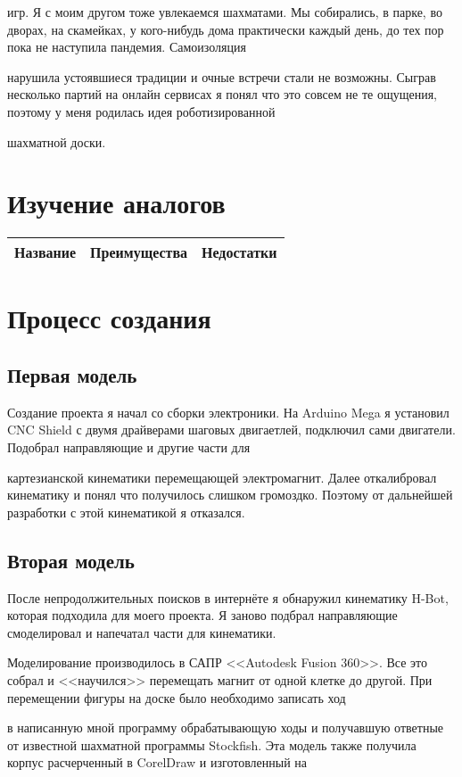 \documentclass[a4paper]{article}
\begin{document}
игр. Я с моим другом тоже увлекаемся шахматами. Мы собирались, в парке, во дворах, на скамейках, у кого-нибудь дома практически каждый день, до тех пор пока не наступила пандемия. Самоизоляция 

нарушила устоявшиеся традиции и очные встречи стали не возможны. Сыграв несколько партий на онлайн сервисах я понял что это совсем не те ощущения, поэтому у меня родилась идея роботизированной 

шахматной доски.
  
  \section {Изучение аналогов}
  \begin{tabular}{|l|l|l|} \hline
    Название & Преимущества & Недостатки \\ \hline
  \end{tabular}

  \section{Процесс создания}
  \subsection{Первая модель}
  Создание проекта я начал со сборки электроники. На Arduino Mega я установил CNC Shield с двумя драйверами шаговых двигаетлей, подключил сами двигатели. Подобрал направляющие и другие части для 

картезианской кинематики перемещающей электромагнит. Далее откалибровал кинематику и понял что получилось слишком громоздко. Поэтому от дальнейшей разработки с этой кинематикой я отказался.
  \subsection{Вторая модель}
  После непродолжительных поисков в интернёте я обнаружил кинематику H-Bot, которая подходила для моего проекта. Я заново подбрал направляющие смоделировал и напечатал части для кинематики. 

Моделирование производилось в САПР <<Autodesk Fusion 360>>. Все это собрал и <<научился>> перемещать магнит от одной клетке до другой. При перемещении фигуры на доске было необходимо записать ход 

в написанную мной программу обрабатывающую ходы и получавшую ответные от известной шахматной программы Stockfish. Эта модель также получила корпус расчерченный в CorelDraw и изготовленный на 
\end{document}
